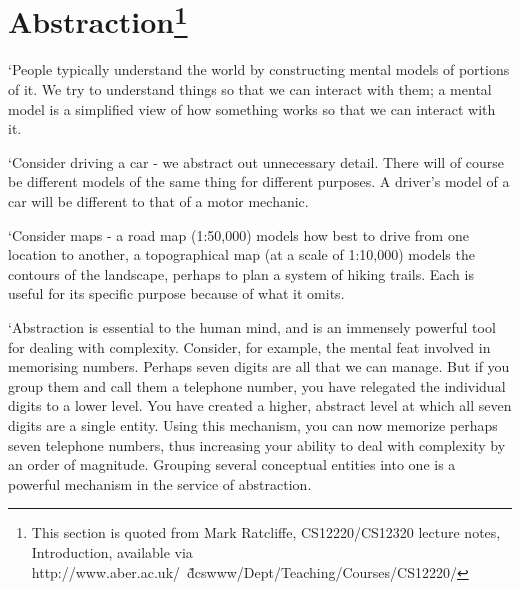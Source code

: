 



\section{Abstraction\footnote{This section is quoted from Mark Ratcliffe, CS12220/CS12320 lecture notes, Introduction, available via http://www.aber.ac.uk/~\~dcswww/Dept/Teaching/Courses/CS12220/}}

`People typically understand the world by constructing mental models of portions of it. We
try to understand things so that we can interact with them; a mental model is a simplified
view of how something works so that we can interact with it.
 
`Consider driving a car - we abstract out unnecessary detail. There will of course be
different models of the same thing for different purposes. A driver's model of a car will be
different to that of a motor mechanic.
 
`Consider maps - a road map (1:50,000) models how best to drive from one location to
another, a topographical map (at a scale of 1:10,000) models the contours of the landscape,
perhaps to plan a system of hiking trails. Each is useful for its specific purpose because of
what it omits. 
 
`Abstraction is essential to the human mind, and is an immensely powerful tool for
dealing with complexity. Consider, for example, the mental feat involved in memorising
numbers. Perhaps seven digits are all that we can manage. But if you group them and call
them a telephone number, you have relegated the individual digits to a lower level. You
have created a higher, abstract level at which all seven digits are a single entity. Using this
mechanism, you can now memorize perhaps seven telephone numbers, thus increasing
your ability to deal with complexity by an order of magnitude. Grouping several conceptual
entities into one is a powerful mechanism in the service of abstraction.
 


